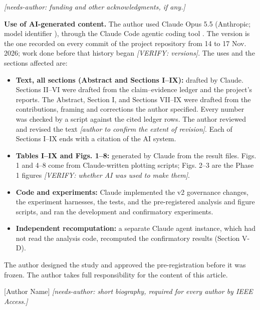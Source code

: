 \documentclass{ieeeaccess}
\begin{document}

\emph{[needs-author: funding and other acknowledgments, if any.]}

\textbf{Use of AI-generated content.} The author used Claude Opus 5.5 (Anthropic; model identifier ), through the Claude Code agentic coding tool \cite{claude}. The version is the one recorded on every commit of the project repository from 14 to 17 Nov. 2026; work done before that history began \emph{[VERIFY: versions]}. The uses and the sections affected are:

\begin{itemize}
\item \textbf{Text, all sections (Abstract and Sections I--IX):} drafted by Claude. Sections II--VI were drafted from the claim--evidence ledger and the project's reports. The Abstract, Section I, and Sections VII--IX were drafted from the contributions, framing and corrections the author specified. Every number was checked by a script against the cited ledger rows. The author reviewed and revised the text \emph{[author to confirm the extent of revision]}. Each of Sections I--IX ends with a citation of the AI system.
\item \textbf{Tables I--IX and Figs. 1--8:} generated by Claude from the result files. Figs. 1 and 4--8 come from Claude-written plotting scripts; Figs. 2--3 are the Phase 1 figures \emph{[VERIFY: whether AI was used to make them]}.
\item \textbf{Code and experiments:} Claude implemented the v2 governance changes, the experiment harnesses, the tests, and the pre-registered analysis and figure scripts, and ran the development and confirmatory experiments.
\item \textbf{Independent recomputation:} a separate Claude agent instance, which had not read the analysis code, recomputed the confirmatory results (Section V-D).
\end{itemize}

The author designed the study and approved the pre-registration before it was frozen. The author takes full responsibility for the content of this article.




\begin{IEEEbiographynophoto}{[Author Name]}
\emph{[needs-author: short biography, required for every author by IEEE Access.]}
\end{IEEEbiographynophoto}

\EOD
\end{document}
